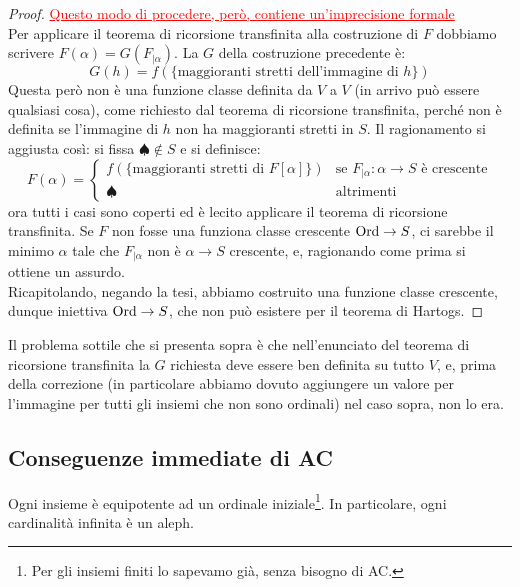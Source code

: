 \begin{proof}
	\textcolor{red}{\underline{Questo modo di procedere, per\`o, contiene un'imprecisione formale}}\\
	Per applicare il teorema di ricorsione transfinita alla costruzione di $F$ dobbiamo scrivere $F(\alpha) = G(F_{|\alpha})$. La $G$ della costruzione precedente \`e:
	\[ G(h) = f(\{\text{maggioranti stretti dell'immagine di $h$}\})
		\]
	Questa per\`o non \`e una funzione classe definita da $V$ a $V$ (in arrivo pu\`o essere qualsiasi cosa), come richiesto dal teorema di ricorsione transfinita, perch\'e non \`e definita se l'immagine di $h$ non ha maggioranti stretti in $S$. Il ragionamento si aggiusta cos\`i: si fissa $\spadesuit \not \in S$ e si definisce:
	\[ F(\alpha) = \begin{cases}
		f(\{\text{maggioranti stretti di $F[\alpha]$}\}) &\text{se $F_{|\alpha} : \alpha \to S$ \`e crescente} \\
		\spadesuit &\text{altrimenti}
	\end{cases}
		\] 
	ora tutti i casi sono coperti ed \`e lecito applicare il teorema di ricorsione transfinita. Se $F$ non fosse una funziona classe crescente $\operatorname{Ord} \to S$, ci sarebbe il minimo $\alpha$ tale che $F_{|\alpha}$ non \`e
	$\alpha \to S$ crescente, e, ragionando come prima si ottiene un assurdo.\\
	Ricapitolando, negando la tesi, abbiamo costruito una funzione classe crescente, dunque iniettiva $\operatorname{Ord} \to S$, che non pu\`o esistere per il teorema di Hartogs.
\end{proof}

\begin{remark}
	Il problema sottile che si presenta sopra \`e che nell'enunciato del teorema di ricorsione transfinita la $G$ richiesta deve essere ben definita su tutto $V$, e, prima della correzione (in particolare abbiamo dovuto aggiungere un valore per l'immagine 
	per tutti gli insiemi che non sono ordinali) nel caso sopra, non lo era.
\end{remark}

\pagebreak
\subsection{Conseguenze immediate di AC}

\begin{proposition}
	Ogni insieme \`e equipotente ad un ordinale iniziale\footnote{Per gli insiemi finiti lo sapevamo gi\`a, senza bisogno di AC.}. In particolare, ogni cardinalit\`a infinita \`e un aleph.
\end{proposition}

